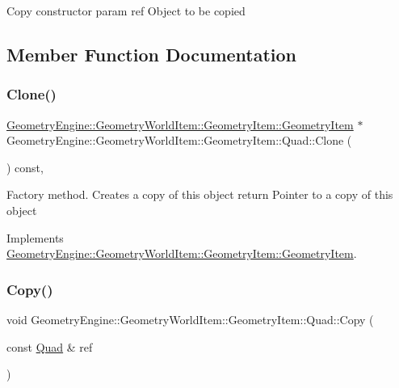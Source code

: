 Copy constructor param ref Object to be copied 

\subsection{Member Function Documentation}
\mbox{\label{class_geometry_engine_1_1_geometry_world_item_1_1_geometry_item_1_1_quad_ad3a6d04a38253d1f26735a87a53a5446}} 
\subsubsection{\texorpdfstring{Clone()}{Clone()}}
{\footnotesize\ttfamily \mbox{\hyperlink{class_geometry_engine_1_1_geometry_world_item_1_1_geometry_item_1_1_geometry_item}{Geometry\+Engine\+::\+Geometry\+World\+Item\+::\+Geometry\+Item\+::\+Geometry\+Item}} $\ast$ Geometry\+Engine\+::\+Geometry\+World\+Item\+::\+Geometry\+Item\+::\+Quad\+::\+Clone (\begin{DoxyParamCaption}{ }\end{DoxyParamCaption}) const\hspace{0.3cm}{\ttfamily [override]}, {\ttfamily [virtual]}}

Factory method. Creates a copy of this object return Pointer to a copy of this object 

Implements \mbox{\hyperlink{class_geometry_engine_1_1_geometry_world_item_1_1_geometry_item_1_1_geometry_item_a1db8f97339ba49f746b3e0b4c4b02748}{Geometry\+Engine\+::\+Geometry\+World\+Item\+::\+Geometry\+Item\+::\+Geometry\+Item}}.

\mbox{\label{class_geometry_engine_1_1_geometry_world_item_1_1_geometry_item_1_1_quad_a560a98ecd908921a42b9f1adf93115b3}} 
\subsubsection{\texorpdfstring{Copy()}{Copy()}}
{\footnotesize\ttfamily void Geometry\+Engine\+::\+Geometry\+World\+Item\+::\+Geometry\+Item\+::\+Quad\+::\+Copy (\begin{DoxyParamCaption}\item[{const \mbox{\hyperlink{class_geometry_engine_1_1_geometry_world_item_1_1_geometry_item_1_1_quad}{Quad}} \&}]{ref }\end{DoxyParamCaption})\hspace{0.3cm}{\ttfamily [virtual]}}

